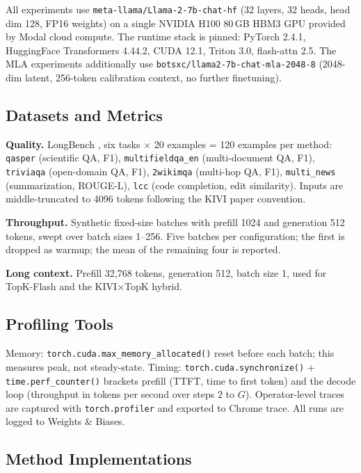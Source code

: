\documentclass[conference]{IEEEtran}
\begin{document}
All experiments use \texttt{meta-llama/Llama-2-7b-chat-hf} (32 layers,
32 heads, head dim 128, FP16 weights) on a single NVIDIA H100 80\,GB
HBM3 GPU provided by Modal cloud compute.  The runtime stack is pinned:
PyTorch 2.4.1, HuggingFace Transformers 4.44.2, CUDA 12.1, Triton 3.0,
flash-attn 2.5.  The MLA experiments additionally use
\texttt{botsxc/llama2-7b-chat-mla-2048-8} \cite{transmla} (2048-dim
latent, 256-token calibration context, no further finetuning).

\subsection{Datasets and Metrics}

\textbf{Quality.}  LongBench \cite{longbench}, six tasks $\times$ 20
examples = 120 examples per method: \texttt{qasper} (scientific QA, F1),
\texttt{multifieldqa\_en} (multi-document QA, F1), \texttt{triviaqa}
(open-domain QA, F1), \texttt{2wikimqa} (multi-hop QA, F1),
\texttt{multi\_news} (summarization, ROUGE-L), \texttt{lcc} (code
completion, edit similarity).  Inputs are middle-truncated to 4096
tokens following the KIVI paper convention.

\textbf{Throughput.}  Synthetic fixed-size batches with prefill 1024
and generation 512 tokens, swept over batch sizes 1--256.  Five batches
per configuration; the first is dropped as warmup; the mean of the
remaining four is reported.

\textbf{Long context.}  Prefill 32{,}768 tokens, generation 512, batch
size 1, used for TopK-Flash and the KIVI$\times$TopK hybrid.

\subsection{Profiling Tools}

Memory: \texttt{torch.cuda.max\_memory\_allocated()} reset before each
batch; this measures peak, not steady-state.  Timing:
\texttt{torch.cuda.synchronize()} + \texttt{time.perf\_counter()}
brackets prefill (TTFT, time to first token) and the decode loop
(throughput in tokens per second over steps $2$ to $G$).
Operator-level traces are captured with \texttt{torch.profiler} and
exported to Chrome trace.  All runs are logged to Weights \& Biases.

\subsection{Method Implementations}
\end{document}
